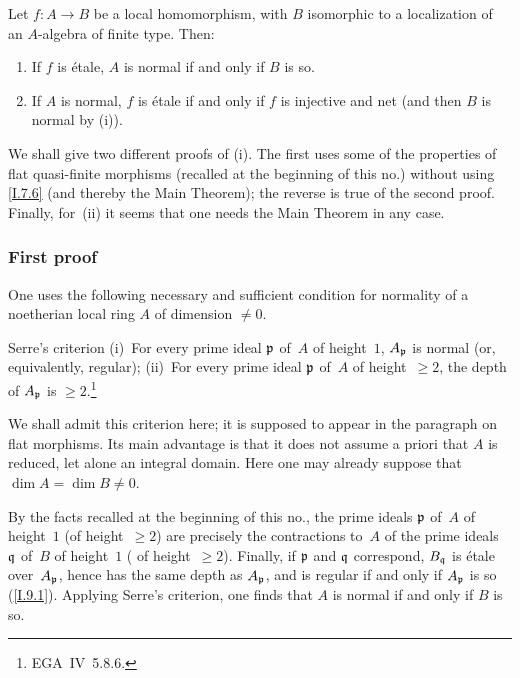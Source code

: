 \begin{theorem}
\label{I.9.5}
Let $f\colon A\to B$ be a local homomorphism, with $B$
isomorphic to a localization of an $A$-algebra of finite
type. Then:
\begin{enumerate}
\item[(i)] If $f$ is \'etale, $A$ is normal if and only if
$B$ is so.
\item[(ii)] If $A$ is normal, $f$ is \'etale if and only if
$f$ is injective and net (and then $B$ is normal by \textup{(i)}).
\end{enumerate}
\end{theorem}

We shall give two different proofs of (i). The first uses
some of the properties of flat quasi-finite morphisms
(recalled at the beginning of this no.) without using
\ref{I.7.6} (and thereby the Main Theorem); the reverse
is true of the second proof. Finally, for~(ii) it seems
that one needs the Main Theorem in any case.

\subsubsection*{First proof}
One uses the following necessary and sufficient condition
for normality of a noetherian local ring $A$ of dimension
$\neq0$.

\begin{namedstatement}{Serre's criterion}
\textup{(i)}~For every prime ideal $\mathfrak{p}$ of~$A$ of
height~$1$, $A_{\mathfrak{p}}$ is normal (or, equivalently,
regular); \textup{(ii)}~For every prime ideal $\mathfrak{p}$
of~$A$ of height~$\geq2$, the depth of $A_{\mathfrak{p}}$ is
$\geq2$.\footnote{\Cf EGA~IV~5.8.6.}
\end{namedstatement}

We shall admit this criterion here; it is supposed to appear
in the paragraph on flat morphisms. Its main advantage
is that it does not assume a priori that $A$ is reduced,
let alone an integral domain. Here one may already suppose
that $\dim{A}=\dim{B}\neq0$.

By the facts recalled at the beginning of this no., the
prime ideals $\mathfrak{p}$ of~$A$ of height~$1$ (\resp of
height~$\ge2$) are precisely the contractions to~$A$ of
the prime ideals~$\mathfrak{q}$ of~$B$ of height~$1$ (\resp
of height~$\ge2$). Finally, if $\mathfrak{p}$ and $\mathfrak{q}$
correspond, $B_{\mathfrak{q}}$ is \'etale over~$A_{\mathfrak{p}}$,
hence has the same depth as $A_{\mathfrak{p}}$, and is regular
if and only if $A_{\mathfrak{p}}$ is so (\ref{I.9.1}). Applying
Serre's criterion, one finds that $A$ is normal if and only
if $B$ is so.

